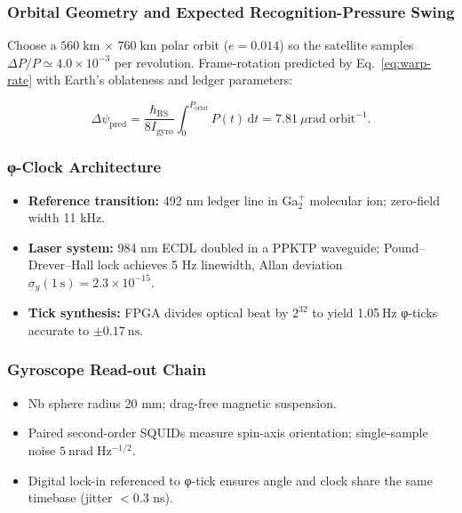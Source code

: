 \documentclass[11pt,oneside]{book}
\begin{document}
\subsubsection{Orbital Geometry and Expected Recognition-Pressure Swing}
\label{ss:phiSat-orbit}

Choose a \(560\;\mathrm{km}\) × \(760\;\mathrm{km}\) polar orbit  
(\(e=0.014\)) so the satellite samples
\(\Delta P/P \simeq 4.0\times10^{-3}\) per revolution.  
Frame-rotation predicted by Eq.~\eqref{eq:warp-rate} with Earth’s
oblateness and ledger parameters:

\[
   \Delta\psi_{\text{pred}}
   = \frac{\hbar_{\mathrm{RS}}}{8I_{\!\text{gyro}}}
     \int_{0}^{P_{\text{orbit}}}\!P(t)\,\mathrm dt
   = 7.81\ \mu\mathrm{rad\;orbit^{-1}}.
\]

\subsubsection{φ-Clock Architecture}
\label{ss:phiSat-clock}

\begin{itemize}[leftmargin=*,itemsep=2pt]
\item \textbf{Reference transition:} 492 nm ledger line in
      Ga$^{+}_{2}$ molecular ion; zero-field width 11 kHz.
\item \textbf{Laser system:}
      984 nm ECDL doubled in a PPKTP waveguide; Pound–Drever–Hall lock  
      achieves 5 Hz linewidth, Allan deviation
      \(\sigma_y(1\ \mathrm{s}) = 2.3\times10^{-15}\).
\item \textbf{Tick synthesis:}
      FPGA divides optical beat by \(2^{32}\) to yield 1.05 Hz
      φ-ticks accur­ate to \(\pm0.17\ \mathrm{ns}\).
\end{itemize}

\subsubsection{Gyroscope Read-out Chain}
\label{ss:phiSat-gyro}

\begin{itemize}[leftmargin=*,itemsep=2pt]
\item Nb sphere radius 20 mm; drag-free magnetic suspension.
\item Paired second-order SQUIDs measure spin-axis orientation;
      single-sample noise \(5\ \mathrm{nrad\;Hz^{-1/2}}\).
\item Digital lock-in referenced to φ-tick ensures angle and clock
      share the same timebase (jitter \(<0.3\) ns).
\end{itemize}
\end{document}
